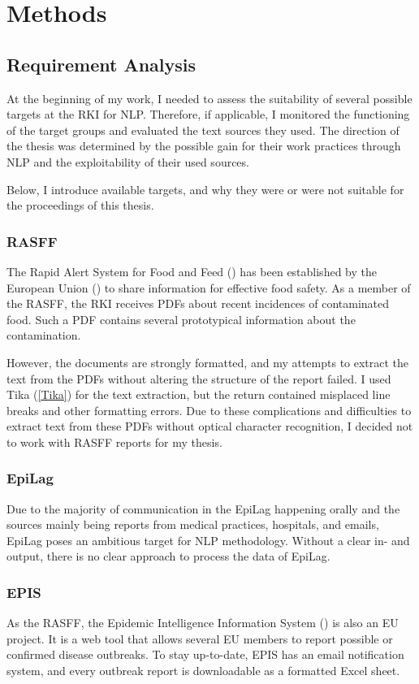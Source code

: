 \chapter{Methods}

\section{Requirement Analysis}
  At the beginning of my work, I needed to assess the suitability of several possible targets at the RKI for NLP.
  Therefore, if applicable, I monitored the functioning of the target groups and evaluated the text sources they used.
  The direction of the thesis was determined by the possible gain for their work practices through NLP and the exploitability of their used sources.

  Below, I introduce available targets, and why they were or were not suitable for the proceedings of this thesis.

\subsection{RASFF}
  The Rapid Alert System for Food and Feed () has been established by the European Union () to share information for effective food safety.
  As a member of the RASFF, the RKI receives PDFs about recent incidences of contaminated food.
  Such a PDF contains several prototypical information about the contamination.

  However, the documents are strongly formatted, and my attempts to extract the text from the PDFs without altering the structure of the report failed.
  I used Tika (\ref{Tika}) for the text extraction, but the return contained misplaced line breaks and other formatting errors.
  Due to these complications and difficulties to extract text from these PDFs without optical character recognition, I decided not to work with RASFF reports for my thesis.

\subsection{EpiLag}
  Due to the majority of communication in the EpiLag happening orally and the sources mainly being reports from medical practices, hospitals, and emails, EpiLag poses an ambitious target for NLP methodology.
  Without a clear in- and output, there is no clear approach to process the data of EpiLag.

\subsection{EPIS}
  As the RASFF, the Epidemic Intelligence Information System () is also an EU project.
  It is a web tool that allows several EU members to report possible or confirmed disease outbreaks.
  To stay up-to-date, EPIS has an email notification system, and every outbreak report is downloadable as a formatted Excel sheet.

